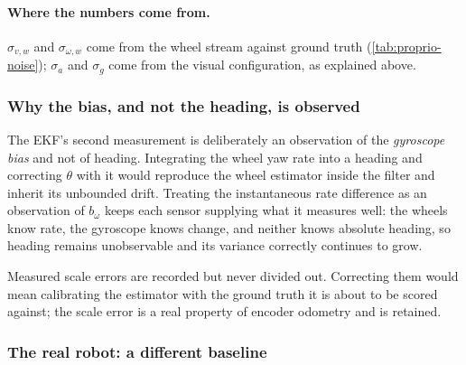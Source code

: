 \paragraph{Where the numbers come from.} $\sigma_{v,w}$ and
$\sigma_{\omega,w}$ come from the wheel stream against ground truth
(\cref{tab:proprio-noise}); $\sigma_a$ and $\sigma_g$ come from the visual
configuration, as explained above. 

\subsubsection{Why the bias, and not the heading, is observed}

The EKF's second measurement is deliberately an observation of the \emph{gyroscope
bias} and not of heading. Integrating the wheel yaw rate into a heading and
correcting $\theta$ with it would reproduce the wheel estimator inside the filter
and inherit its unbounded drift. Treating the instantaneous rate difference as an
observation of $b_\omega$ keeps each sensor supplying what it measures well: the
wheels know rate, the gyroscope knows change, and neither knows absolute heading,
so heading remains unobservable and its variance correctly continues to grow.

Measured scale errors are recorded but never divided out. Correcting them would
mean calibrating the estimator with the ground truth it is about to be scored
against; the scale error is a real property of encoder odometry and is retained.

\subsubsection{The real robot: a different baseline}


